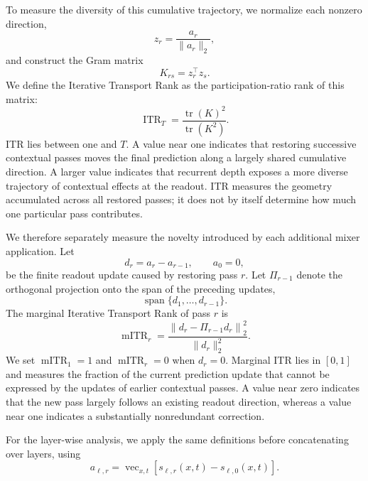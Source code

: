 \documentclass[letterpaper]{article} %
\begin{document}
To measure the diversity of this cumulative trajectory, we normalize each
nonzero direction,
\begin{equation}
z_r=\frac{a_r}{\|a_r\|_2},
\end{equation}
and construct the Gram matrix
\begin{equation}
K_{rs}=z_r^\top z_s.
\end{equation}
We define the Iterative Transport Rank as the participation-ratio rank of this
matrix:
\begin{equation}
\operatorname{ITR}_T
=\frac{\operatorname{tr}(K)^2}
{\operatorname{tr}(K^2)}.
\label{eq:itr}
\end{equation}
ITR lies between one and $T$. A value near one indicates that restoring
successive contextual passes moves the final prediction along a largely shared
cumulative direction. A larger value indicates that recurrent depth exposes a
more diverse trajectory of contextual effects at the readout. ITR measures the
geometry accumulated across all restored passes; it does not by itself
determine how much one particular pass contributes.

We therefore separately measure the novelty introduced by each additional
mixer application. Let
\begin{equation}
d_r=a_r-a_{r-1},
\qquad
a_0=0,
\end{equation}
be the finite readout update caused by restoring pass $r$. Let
$\Pi_{r-1}$ denote the orthogonal projection onto the span of the preceding
updates,
\begin{equation}
\operatorname{span}\{d_1,\ldots,d_{r-1}\}.
\end{equation}
The marginal Iterative Transport Rank of pass $r$ is
\begin{equation}
\operatorname{mITR}_r
=\frac{\left\|d_r-\Pi_{r-1}d_r\right\|_2^2}
{\|d_r\|_2^2}.
\label{eq:mitr}
\end{equation}
We set $\operatorname{mITR}_1=1$ and
$\operatorname{mITR}_r=0$ when $d_r=0$. Marginal ITR lies in $[0,1]$ and
measures the fraction of the current prediction update that cannot be expressed
by the updates of earlier contextual passes. A value near zero indicates that
the new pass largely follows an existing readout direction, whereas a value
near one indicates a substantially nonredundant correction.

For the layer-wise analysis, we apply the same definitions before
concatenating over layers, using
\begin{equation}
a_{\ell,r}
=\operatorname{vec}_{x,t}\!\left[
s_{\ell,r}(x,t)-s_{\ell,0}(x,t)
\right].
\label{eq:layerwise_readout_trajectory}
\end{equation}
\end{document}
